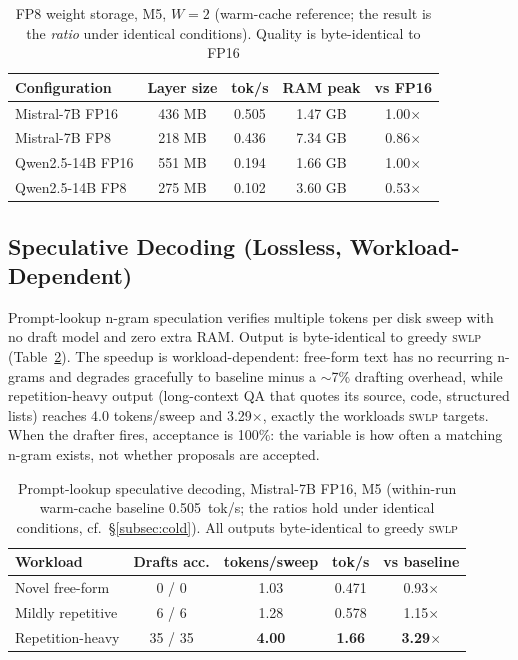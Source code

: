 \documentclass[10pt,a4paper]{article}
\newcommand{\swlp}{\textsc{swlp}}
\begin{document}
\begin{table}[htbp]
\centering
\caption{FP8 weight storage, M5, $W=2$ (warm-cache reference; the result is the
\emph{ratio} under identical conditions). Quality is byte-identical to FP16}
\label{tab:fp8}
\begin{tabular}{@{}lcccc@{}}
\toprule
\textbf{Configuration} & \textbf{Layer size} & \textbf{tok/s} & \textbf{RAM peak} & \textbf{vs FP16} \\
\midrule
Mistral-7B FP16 & 436 MB & 0.505 & 1.47 GB & 1.00$\times$ \\
Mistral-7B FP8 & 218 MB & 0.436 & 7.34 GB & 0.86$\times$ \\
Qwen2.5-14B FP16 & 551 MB & 0.194 & 1.66 GB & 1.00$\times$ \\
Qwen2.5-14B FP8 & 275 MB & 0.102 & 3.60 GB & 0.53$\times$ \\
\bottomrule
\end{tabular}
\end{table}

\subsection{Speculative Decoding (Lossless, Workload-Dependent)}
\label{subsec:spec}

Prompt-lookup n-gram speculation verifies multiple tokens per disk sweep with no
draft model and zero extra RAM. Output is byte-identical to greedy \swlp{}
(Table~\ref{tab:spec}). The speedup is workload-dependent: free-form text has no
recurring n-grams and degrades gracefully to baseline minus a $\sim$7\% drafting
overhead, while repetition-heavy output (long-context QA that quotes its source,
code, structured lists) reaches 4.0 tokens/sweep and 3.29$\times$, exactly the
workloads \swlp{} targets. When the drafter fires, acceptance is 100\%: the
variable is how often a matching n-gram exists, not whether proposals are
accepted.

\begin{table}[htbp]
\centering
\caption{Prompt-lookup speculative decoding, Mistral-7B FP16, M5
(within-run warm-cache baseline 0.505~tok/s; the ratios hold under identical
conditions, cf.\ \S\ref{subsec:cold}). All outputs byte-identical to greedy \swlp{}}
\label{tab:spec}
\begin{tabular}{@{}lcccc@{}}
\toprule
\textbf{Workload} & \textbf{Drafts acc.} & \textbf{tokens/sweep} & \textbf{tok/s} & \textbf{vs baseline} \\
\midrule
Novel free-form & 0 / 0 & 1.03 & 0.471 & 0.93$\times$ \\
Mildly repetitive & 6 / 6 & 1.28 & 0.578 & 1.15$\times$ \\
Repetition-heavy & 35 / 35 & \textbf{4.00} & \textbf{1.66} & \textbf{3.29$\times$} \\
\bottomrule
\end{tabular}
\end{table}
\end{document}
